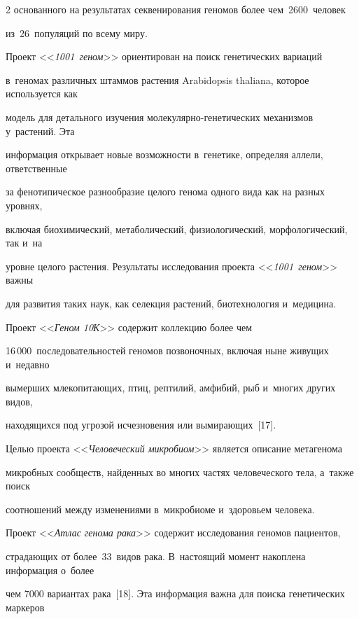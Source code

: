 \begin{multicols}{2}
основанного на результатах секвенирования геномов более чем~2600~человек 


из~26~популяций по всему миру. 


  


  Проект <<\textit{1001~геном}>> ориентирован на поиск генетиче\-ских вариаций 


в~геномах различных штаммов растения Arabidopsis thaliana, которое используется как 


модель для детального изучения мо\-ле\-ку\-ляр\-но-генетических механизмов у~растений. Эта 


информация открывает новые возможности в~генетике, определяя аллели, ответственные 


за фенотипическое разнообразие целого генома одного вида как на разных уровнях, 


включая биохимический, метаболический, физиологический, морфологический, так и~на 


уровне целого растения. Результаты исследования проекта <<\textit{1001~геном}>> важны 


для развития таких наук, как селекция растений, биотехнология и~медицина.


  


  Проект <<\textit{Геном 10К}>> содержит коллекцию более чем 


16\,000~последовательностей геномов позвоночных, включая ныне живущих и~недавно 


вымерших млекопитающих, птиц, рептилий, амфибий, рыб и~многих других видов, 


находящихся под угрозой исчезновения или вымирающих~[17].


  


  Целью проекта <<\textit{Человеческий микробиом}>> является описание метагенома 


микробных сообществ, найденных во многих частях человеческого тела, а~также поиск 


соотношений между изменениями в~микробиоме и~здоровьем человека. 


  


  Проект <<\textit{Атлас генома рака}>> содержит исследования геномов пациентов, 


страдающих от более~33~видов рака. В~настоящий момент накоплена информация о~более 


чем 7000 вариантах рака~[18]. Эта информация важна для поиска генетических маркеров 



\end{multicols}
